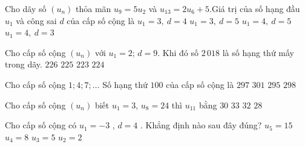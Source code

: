 \begin{ex}%
	Cho  dãy số $(u_n)$ thỏa mãn $u_9=5u_2$ và $ u_{13}=2 u_6+5$.Giá trị của số hạng đầu $u_1$ và công sai $d$ của cấp số cộng là
	 \choice
		{\True $u_1=3,  \ d=4$}
		 {$u_1=3, \ d=5$}
		 {$u_1=4, \ d=5$}
		{$u_1=4, \  d=3$}
\end{ex}

\begin{ex}%
	Cho cấp số cộng $(u_n)$ với $u_1=2$; $d=9$. Khi đó  số $2\,018$ là số hạng thứ mấy trong dãy.
	\choice 
		{$226$} 
		{\True  $225$}
		{$223$} 
		{$224$} 
\end{ex}

\begin{ex}%
	Cho cấp số cộng $1;4;7;\ldots$ Số hạng thứ $100$  của cấp số cộng là
	 \choice
		{$297$} 
		 {$301$}
		{$295$} 
		{\True  $298$}
\end{ex}

\begin{ex}%
	 Cho cấp số cộng $(u_n)$ biết $u_1=3$, $u_8=24$ thì $u_{11}$ bằng
	 \choice
		{$30$} 
		 {\True $33$}
		{$32$} 
		{$28$} 
\end{ex}

\begin{ex}%
	Cho cấp số cộng  có
	 $u_1=-3$
	, 
	$d=4$ 
	. Khẳng  định nào sau đây đúng?
	 \choice
		{${u_5}=15$} 
		 {${u_4}=8$}
		{\True  ${u_3}=5$}
		 {$u_2=2$}
\end{ex}

